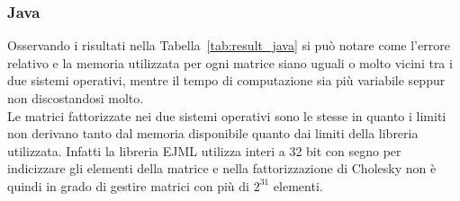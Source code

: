 \documentclass[a4paper, 12pt]{article}
\begin{document}
\subsubsection{Java}
Osservando i risultati nella Tabella~\ref{tab:result_java} si può notare come
l'errore relativo e la memoria utilizzata per ogni matrice siano uguali o molto
vicini tra i due sistemi operativi, mentre il tempo di computazione sia più
variabile seppur non discostandosi molto.\\
Le matrici fattorizzate nei due sistemi operativi sono le stesse in quanto i
limiti non derivano tanto dal memoria disponibile quanto dai limiti della
libreria utilizzata. Infatti la libreria EJML utilizza interi a 32 bit con segno
per indicizzare gli elementi della matrice e nella fattorizzazione di Cholesky
non è quindi in grado di gestire matrici con più di $2^{31}$ elementi.
\begin{table}[ht]
\centering
{}
\caption{Risultati dei benchmark Java}
\label{tab:result_java}
\end{table}
\end{document}
